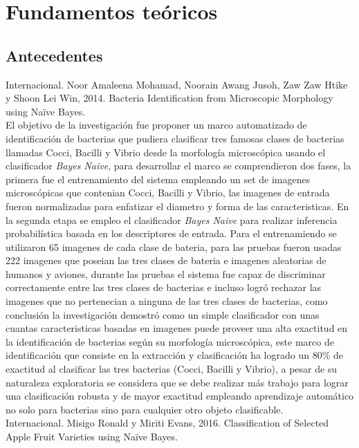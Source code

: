 \chapter{Fundamentos te\'oricos}

\section{Antecedentes}

Internacional. Noor Amaleena Mohamad, Noorain Awang Jusoh, Zaw Zaw Htike y Shoon
Lei Win, 2014. Bacteria Identification from Microscopic Morphology using Naïve Bayes.\\

El objetivo de la investigación fue proponer un marco automatizado de identificación de bacterias que pudiera clasificar tres famosas clases de bacterias llamadas Cocci, Bacilli y Vibrio desde la morfología microscópica usando el clasificador \textit{Bayes Naive}, para desarrollar el marco se comprendieron dos fases, la primera fue el entrenamiento del sistema empleando un set de imagenes microscópicas que contenian Cocci, Bacilli y Vibrio, las imagenes de entrada fueron normalizadas para enfatizar el diametro y forma de las caracteristicas. En la segunda etapa se empleo el clasificador \textit{Bayes Naive} para realizar inferencia probabilística basada en los descriptores de entrada. Para el entrenamiendo se utilizaron 65 imagenes de cada clase de bateria, para las pruebas fueron usadas 222 imagenes que poseian las tres clases de bateria e imagenes aleatorias de humanos y aviones, durante las pruebas el sistema fue capaz de discriminar correctamente entre las tres clases de bacterias e incluso logró rechazar las imagenes que no pertenecian a ninguna de las tres clases de bacterias, como conclusión la investigación demostró como un simple clasificador con unas cuantas caracteristicas basadas en imagenes puede proveer una alta exactitud en la identificación de bacterias según su morfología microscópica, este marco de identificación que consiste en la extracción y clasificación ha logrado un 80\% de exactitud al clasificar las tres bacterias (Cocci, Bacilli y Vibrio), a pesar de su naturaleza exploratoria se considera que se debe realizar más trabajo para lograr una clasificación robusta y de mayor exactitud empleando aprendizaje automático no solo para bacterias sino para cualquier otro objeto clasificable.\\

Internacional. Misigo Ronald y Miriti Evans, 2016. Classification of Selected Apple Fruit Varieties using Naïve Bayes.\\

